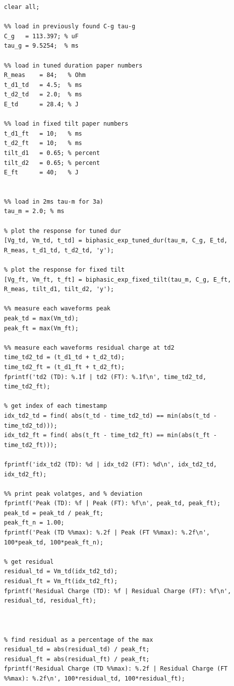 \documentclass[]{report}
\begin{document}
\begin{lstlisting}[style=Matlab-editor, backgroundcolor=\color{smoky}, basicstyle=\ttfamily\tiny]
clear all;

%% load in previously found C-g tau-g
C_g   = 113.397; % uF
tau_g = 9.5254;  % ms

%% load in tuned duration paper numbers
R_meas    = 84;   % Ohm
t_d1_td   = 4.5;  % ms
t_d2_td   = 2.0;  % ms
E_td      = 28.4; % J

%% load in fixed tilt paper numbers
t_d1_ft   = 10;   % ms
t_d2_ft   = 10;   % ms
tilt_d1   = 0.65; % percent
tilt_d2   = 0.65; % percent
E_ft      = 40;   % J


%% load in 2ms tau-m for 3a)
tau_m = 2.0; % ms

% plot the response for tuned dur
[Vg_td, Vm_td, t_td] = biphasic_exp_tuned_dur(tau_m, C_g, E_td, R_meas, t_d1_td, t_d2_td, 'y');

% plot the response for fixed tilt
[Vg_ft, Vm_ft, t_ft] = biphasic_exp_fixed_tilt(tau_m, C_g, E_ft, R_meas, tilt_d1, tilt_d2, 'y');

%% measure each waveforms peak
peak_td = max(Vm_td);
peak_ft = max(Vm_ft);

%% measure each waveforms residual charge at td2
time_td2_td = (t_d1_td + t_d2_td);
time_td2_ft = (t_d1_ft + t_d2_ft);
fprintf('td2 (TD): %.1f | td2 (FT): %.1f\n', time_td2_td, time_td2_ft);

% get index of each timestamp
idx_td2_td = find( abs(t_td - time_td2_td) == min(abs(t_td - time_td2_td)));
idx_td2_ft = find( abs(t_ft - time_td2_ft) == min(abs(t_ft - time_td2_ft)));

fprintf('idx_td2 (TD): %d | idx_td2 (FT): %d\n', idx_td2_td, idx_td2_ft);

%% print peak volatges, and % deviation
fprintf('Peak (TD): %f | Peak (FT): %f\n', peak_td, peak_ft);
peak_td = peak_td / peak_ft;
peak_ft_n = 1.00;
fprintf('Peak (TD %%max): %.2f | Peak (FT %%max): %.2f\n', 100*peak_td, 100*peak_ft_n);

% get residual
residual_td = Vm_td(idx_td2_td);
residual_ft = Vm_ft(idx_td2_ft);
fprintf('Residual Charge (TD): %f | Residual Charge (FT): %f\n', residual_td, residual_ft);



% find residual as a percentage of the max
residual_td = abs(residual_td) / peak_ft;
residual_ft = abs(residual_ft) / peak_ft;
fprintf('Residual Charge (TD %%max): %.2f | Residual Charge (FT %%max): %.2f\n', 100*residual_td, 100*residual_ft);
\end{lstlisting}
\end{document}
